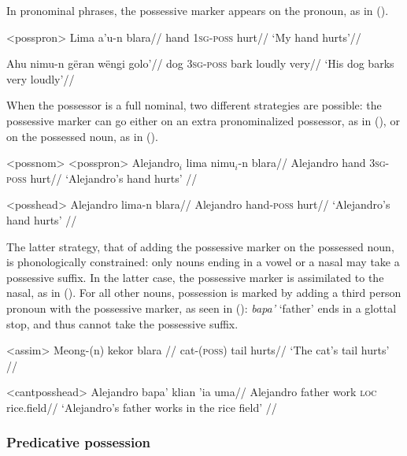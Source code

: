 \documentclass[12pt]{article}
\begin{document}
In pronominal phrases, the possessive marker appears on the pronoun, as in ().

\pex<posspron> %
\begingl %
\gla Lima a'u-n blara//
\glb hand 1\textsc{sg}-\textsc{poss} hurt//
\glft `My hand hurts'//
\endgl

\begingl %
\gla Ahu nimu-n gëran wëngi golo'//
\glb dog 3\textsc{sg}-\textsc{poss} bark loudly very//
\glft `His dog barks very loudly'// 
\endgl
\xe

When the possessor is a full nominal, two different strategies are possible: the possessive marker can go either on an extra pronominalized possessor, as in (), or on the possessed noun, as in ().

\pex<possnom> %
\a<posspron> %
\begingl %
\gla Alejandro$_i$ lima nimu$_i$-n blara//
\glb Alejandro hand 3\textsc{sg}-\textsc{poss} hurt//
\glft `Alejandro's hand hurts' // 
\endgl

\a<posshead> %
\begingl %
\gla Alejandro lima-n blara//
\glb Alejandro hand-\textsc{poss} hurt//
\glft `Alejandro's hand hurts' // 
\endgl
\xe

The latter strategy, that of adding the possessive marker on the possessed noun, is phonologically constrained: only  nouns ending in a vowel or a nasal may take a possessive suffix. In the latter case, the possessive marker is assimilated to the nasal, as in (). For all other nouns, possession is marked by adding a third person pronoun with the possessive marker, as seen in (): \textit{bapa'} `father' ends in a glottal stop, and thus cannot take the possessive suffix.

\ex<assim> %
\begingl %
\gla Meong-(n) kekor blara //
\glb cat-(\textsc{poss}) tail hurts//
\glft `The cat's tail hurts' // 
\endgl
\xe

\ex<cantposshead>
\begingl %
\gla Alejandro bapa' klian 'ia uma//
\glb Alejandro father work \textsc{loc} rice.field//
\glft `Alejandro's father works in the rice field' // 
\endgl
\xe

\subsubsection{Predicative possession}
\end{document}
